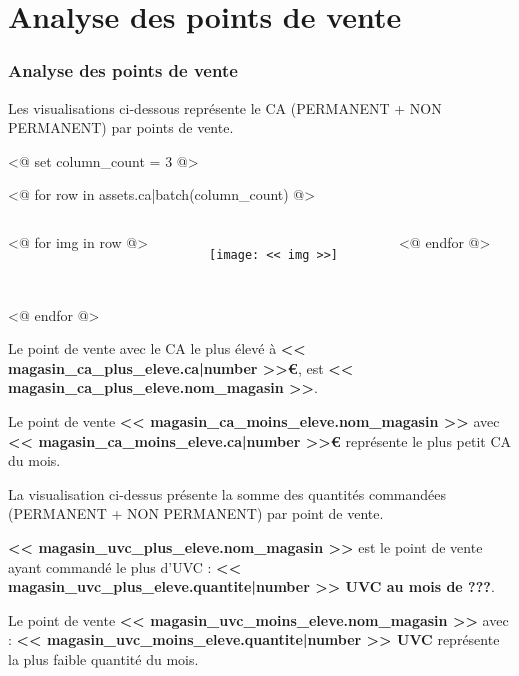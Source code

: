 \section{Analyse des points de vente}

\begin{frame}
    \tiny
    \frametitle{Analyse des points de vente}

    Les visualisations ci-dessous représente le CA (PERMANENT + NON PERMANENT) par points de vente.\par

    <@ set column_count = 3  @>

    <@ for row in assets.ca|batch(column_count) @>
        \begin{columns}
            <@ for img in row @>
                    \centering
                    \begin{figure}[h]
                        \centering
                        \texttt{[image: << img >>]}
                    \end{figure}
            <@ endfor @>
        \end{columns}
    <@ endfor @>

    Le point de vente avec le CA le plus élevé à \textbf{<< magasin_ca_plus_eleve.ca|number >>€}, est \textbf{<< magasin_ca_plus_eleve.nom_magasin >>}.\par
    Le point de vente \textbf{<< magasin_ca_moins_eleve.nom_magasin >>} avec \textbf{<< magasin_ca_moins_eleve.ca|number >>€} représente le plus petit CA du mois.\par
    La visualisation ci-dessus présente la somme des quantités commandées (PERMANENT + NON PERMANENT) par point de vente.\par
    \textbf{<< magasin_uvc_plus_eleve.nom_magasin >>} est le point de vente ayant commandé le plus d’UVC : \textbf{<< magasin_uvc_plus_eleve.quantite|number >> UVC au mois de ???}.\par
    Le point de vente \textbf{<< magasin_uvc_moins_eleve.nom_magasin >>} avec : \textbf{<< magasin_uvc_moins_eleve.quantite|number >> UVC} représente la plus faible quantité du mois.\par
\end{frame}
